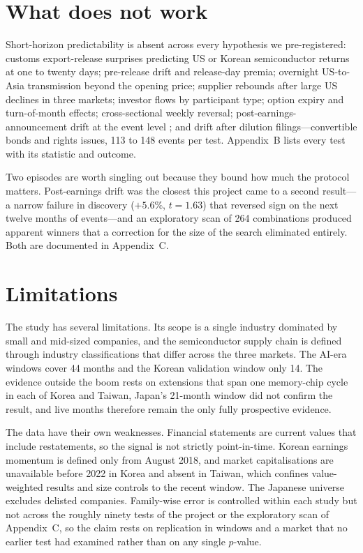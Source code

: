 \documentclass[12pt,a4paper]{article}
\begin{document}
\section{What does not work}\label{sec:negative}

Short-horizon predictability is absent across every hypothesis we pre-registered: customs export-release surprises
predicting US or Korean semiconductor returns at one to twenty days; pre-release drift and release-day premia;
overnight US-to-Asia transmission beyond the opening price; supplier rebounds after large US declines in three markets;
investor flows by participant type; option expiry and turn-of-month effects; cross-sectional weekly reversal;
post-earnings-announcement drift at the event level \citep[for the Korean drift literature see][]{eom2019}; and drift
after dilution filings---convertible bonds and rights issues, 113 to 148 events per test. Appendix~B lists every test
with its statistic and outcome.

Two episodes are worth singling out because they bound how much the protocol matters. Post-earnings drift was the
closest this project came to a second result---a narrow failure in discovery ($+5.6\%$, $t=1.63$) that reversed sign on
the next twelve months of events---and an exploratory scan of 264 combinations produced apparent winners that a
correction for the size of the search eliminated entirely. Both are documented in Appendix~C.

\section{Limitations}\label{sec:limits}

The study has several limitations. Its scope is a single industry dominated by small and mid-sized companies, and the
semiconductor supply chain is defined through industry classifications that differ across the three markets. The
AI-era windows cover 44 months and the Korean validation window only 14. The evidence outside the boom rests on
extensions that span one memory-chip cycle in each of Korea and Taiwan, Japan's 21-month window did not confirm the
result, and live months therefore remain the only fully prospective evidence.

The data have their own weaknesses. Financial statements are current values that include restatements, so the signal
is not strictly point-in-time. Korean earnings momentum is defined only from August 2018, and market capitalisations
are unavailable before 2022 in Korea and absent in Taiwan, which confines value-weighted results and size controls to
the recent window. The Japanese universe excludes delisted companies. Family-wise error is controlled within each study
but not across the roughly ninety tests of the project or the exploratory scan of Appendix~C, so the claim rests on
replication in windows and a market that no earlier test had examined rather than on any single $p$-value.
\end{document}
